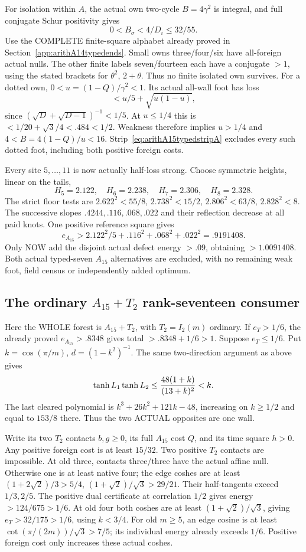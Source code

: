 \documentclass[11pt]{article}
\begin{document}
For isolation within \(A\), the actual
own two-cycle \(B=4\gamma^2\) is integral,
and full conjugate Schur positivity gives
\[
                         0<B_\sigma<4/D_i\le32/55 .
\]
Use the COMPLETE finite-square alphabet
already proved in
Section~\ref{app:arithA14typedends}.
Small owns three/four/six have all-foreign
actual nulls.
The other finite labels seven/fourteen
each have a conjugate \(>1\), using
the stated brackets for \(\theta^2\),
\(2+\theta\).
Thus no finite isolated own survives.
For a dotted own, \(0<u=(1-Q)/\gamma^2<1\).
Its actual all-wall foot has loss
\[
                  <u/5+\sqrt{u(1-u)},
\]
since \((\sqrt D+\sqrt{D-1})^{-1}<1/5\).
At \(u\le1/4\) this is
\(<1/20+\sqrt3/4<.484<1/2\).
Weakness therefore implies \(u>1/4\)
and \(4<B=4(1-Q)/u<16\).
Strip~\eqref{eq:arithA15typedstripA}
excludes every such dotted foot, including
both positive foreign costs.

Every site \(5,\ldots,11\) is now actually
half-loss strong.
Choose symmetric heights, linear on the tails,
\[
           H_5=2.122,\quad H_6=2.238,\quad
           H_7=2.306,\quad H_8=2.328 .
\]
The strict floor tests are
\(2.622^2<55/8\), \(2.738^2<15/2\),
\(2.806^2<63/8\), \(2.828^2<8\).
The successive slopes
\(.4244,.116,.068,.022\) and their
reflection decrease at all paid knots.
One positive reference square gives
\[
        e_{A_{15}}>2.122^2/5+.116^2+.068^2+.022^2=.9191408 .
\]
Only NOW add the disjoint actual defect
energy \(>.09\), obtaining \(>1.0091408\).
Both actual typed-seven \(A_{15}\) alternatives
are excluded, with no remaining weak foot,
field census or independently added optimum.

\subsection{The ordinary \(A_{15}+T_2\) rank-seventeen consumer}
\label{app:arithA15ordinary}

Here the WHOLE forest is \(A_{15}+T_2\),
with \(T_2=I_2(m)\) ordinary.
If \(e_T>1/6\), the already proved
\(e_{A_{15}}>.8348\) gives total
\(>.8348+1/6>1\).
Suppose \(e_T\le1/6\).
Put \(k=\cos(\pi/m)\), \(d=(1-k^2)^{-1}\).
The same two-direction argument as above gives
\[
               \tanh L_1\tanh L_2
                  \le{48(1+k)\over(13+k)^2}<k .
\]
The last cleared polynomial is
\(k^3+26k^2+121k-48\), increasing on
\(k\ge1/2\) and equal to \(153/8\) there.
Thus the two ACTUAL opposites are one wall.

Write its two \(T_2\) contacts \(b,g\ge0\),
its full \(A_{15}\) cost \(Q\), and
its time square \(h>0\).
Any positive foreign cost is at least
\(15/32\).
Two positive \(T_2\) contacts are impossible.
At old three, contacts three/three have
the actual affine null.
Otherwise one is at least native four;
the edge coshes are at least
\((1+2\sqrt2)/3>5/4\),
\((1+\sqrt2)/\sqrt3>29/21\).
Their half-tangents exceed \(1/3,2/5\).
The positive dual certificate at correlation
\(1/2\) gives energy \(>124/675>1/6\).
At old four both coshes are at least
\((1+\sqrt2)/\sqrt3\), giving
\(e_T>32/175>1/6\), using \(k<3/4\).
For old \(m\ge5\), an edge cosine is at
least \(\cot(\pi/(2m))/\sqrt3>7/5\);
its individual energy already exceeds \(1/6\).
Positive foreign cost only increases these
actual coshes.
\end{document}

